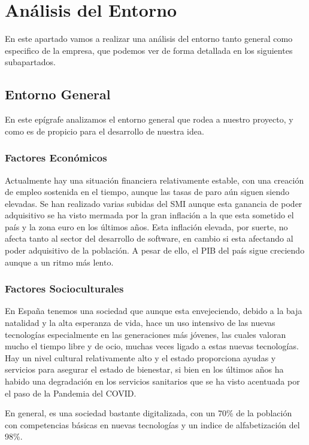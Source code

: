\section{Análisis del Entorno}
En este apartado vamos a realizar una análisis del entorno tanto general como especifico de la empresa, que podemos ver de forma detallada en los siguientes subapartados.

\subsection{Entorno General}
En este epígrafe analizamos el entorno general que rodea a nuestro proyecto, y como es de propicio para el desarrollo de nuestra idea.

\subsubsection{Factores Económicos}
Actualmente hay una situación financiera relativamente estable, con una creación de empleo sostenida en el tiempo, aunque las tasas de paro aún siguen siendo elevadas. Se han realizado varias subidas del SMI aunque esta ganancia de poder adquisitivo se ha visto mermada por la gran inflación a la que esta sometido el país y la zona euro en los últimos años. Esta inflación elevada, por suerte, no afecta tanto al sector del desarrollo de software, en cambio si esta afectando al poder adquisitivo de la población. A pesar de ello, el PIB del país sigue creciendo aunque a un ritmo más lento.

\subsubsection{Factores Socioculturales}
En España tenemos una sociedad que aunque esta envejeciendo, debido a la baja natalidad y la alta esperanza de vida, hace un uso intensivo de las nuevas tecnologías especialmente en las generaciones más jóvenes, las cuales valoran mucho el tiempo libre y de ocio, muchas veces ligado a estas nuevas tecnologías. Hay un nivel cultural relativamente alto y el estado proporciona ayudas y servicios para asegurar el estado de bienestar, si bien en los últimos años ha habido una degradación en los servicios sanitarios que se ha visto acentuada por el paso de la Pandemia del COVID.

En general, es una sociedad bastante digitalizada, con un 70\% de la población con competencias básicas en nuevas tecnologías y un indice de alfabetización del 98\%.

